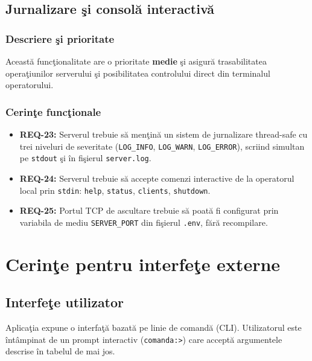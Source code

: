 \documentclass[12pt, a4paper]{article}
\begin{document}
\subsection{Jurnalizare \c{s}i consol\u{a} interactiv\u{a}}

\subsubsection{Descriere \c{s}i prioritate}

Aceast\u{a} func\c{t}ionalitate are o prioritate \textbf{medie} \c{s}i asigur\u{a} trasabilitatea opera\c{t}iunilor serverului
\c{s}i posibilitatea controlului direct din terminalul operatorului.

\subsubsection{Cerin\c{t}e func\c{t}ionale}

\begin{itemize}
    \item \textbf{REQ-23:} Serverul trebuie s\u{a} men\c{t}in\u{a} un sistem de jurnalizare thread-safe cu trei
    niveluri de severitate (\texttt{LOG\_INFO}, \texttt{LOG\_WARN}, \texttt{LOG\_ERROR}), scriind simultan pe
    \texttt{stdout} \c{s}i \^{i}n fi\c{s}ierul \texttt{server.log}.
    \item \textbf{REQ-24:} Serverul trebuie s\u{a} accepte comenzi interactive de la operatorul local prin
    \texttt{stdin}: \texttt{help}, \texttt{status}, \texttt{clients}, \texttt{shutdown}.
    \item \textbf{REQ-25:} Portul TCP de ascultare trebuie s\u{a} poat\u{a} fi configurat prin variabila de
    mediu \texttt{SERVER\_PORT} din fi\c{s}ierul \texttt{.env}, f\u{a}r\u{a} recompilare.
\end{itemize}

\section{Cerin\c{t}e pentru interfe\c{t}e externe}

\subsection{Interfe\c{t}e utilizator}

Aplica\c{t}ia expune o interfa\c{t}\u{a} bazat\u{a} pe linie de comand\u{a} (CLI). Utilizatorul este \^{i}nt\^{a}mpinat de un
prompt interactiv (\texttt{comanda:>}) care accept\u{a} argumentele descrise \^{i}n tabelul de mai jos.
\end{document}
